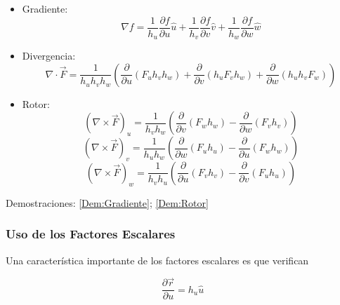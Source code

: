 \begin{itemize}
    \item Gradiente:
    \[\nabla f =
    \frac{1}{h_u}\frac{\partial f}{\partial u}\hat{u}+
    \frac{1}{h_v}\frac{\partial f}{\partial v}\hat{v}+
    \frac{1}{h_w}\frac{\partial f}{\partial w}\hat{w}\]
    \item Divergencia:
    \[\nabla\cdot\Vec{F}=\frac{1}{h_uh_vh_w}\left(
    \frac{\partial}{\partial u}(F_uh_vh_w) +
    \frac{\partial}{\partial v}(h_uF_vh_w) +
    \frac{\partial}{\partial w}(h_uh_vF_w)\right)\]
    \item Rotor:
    \[\left(\nabla\times\Vec{F}\right)_u = \frac{1}{h_vh_w}
    \left(\frac{\partial}{\partial v}(F_wh_w)-
    \frac{\partial}{\partial w}(F_vh_v)\right)\]
    \[\left(\nabla\times\Vec{F}\right)_v = \frac{1}{h_uh_w}
    \left(\frac{\partial}{\partial w}(F_uh_u)-
    \frac{\partial}{\partial u}(F_wh_w)\right)\]
    \[\left(\nabla\times\Vec{F}\right)_w = \frac{1}{h_vh_u}
    \left(\frac{\partial}{\partial u}(F_vh_v)-
    \frac{\partial}{\partial v}(F_uh_u)\right)\]
\end{itemize}

Demostraciones: \ref{Dem:Gradiente}; \ref{Dem:Rotor}

\subsubsection{Uso de los Factores Escalares}

Una característica importante de los factores escalares es que verifican

\[\frac{\partial\Vec{r}}{\partial u} = h_u\hat{u}\]

